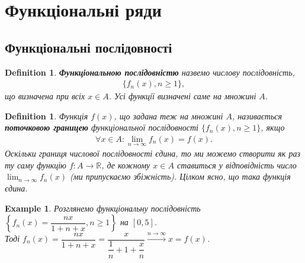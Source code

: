 \documentclass[a4paper, 10pt]{article}
\def\huge{\displaystyle}
\theoremstyle{theoremdd}
\theoremstyle{theoremdd}
\theoremstyle{theoremdd}
\newtheorem{definition}[theorem]{Definition}
\theoremstyle{theoremdd}
\theoremstyle{theoremdd}
\newtheorem{example}[theorem]{Example}
\theoremstyle{theoremdd}
\theoremstyle{theoremdd}
\theoremstyle{theoremdd}
\theoremstyle{theoremdd}
\begin{document}
\iffalse
\section{Функціональні ряди}
\subsection{Функціональні послідовності}
\begin{definition}
\textbf{Функціональною послідовністю} назвемо числову послідовність,
\begin{align*}
\{f_n(x), n \geq 1 \},
\end{align*}
що визначена при всіх $x \in A$. Усі функції визначені саме на множині $A$.
\end{definition}

\begin{definition}
Функція $f(x)$, що задана теж на множині $A$, називається \textbf{поточковою границею} функціональної послідовності $\{f_n(x), n \geq 1\}$, якщо
\begin{align*}
\forall x \in A: \lim_{n \to \infty} f_n(x) = f(x).
\end{align*}
Оскільки границя числової послідовності єдина, то ми можемо створити як раз ту саму функцію $f \colon A \to \mathbb{R}$, де кожному $x \in A$ ставиться у відповідність число $\displaystyle\lim_{n \to \infty} f_n(x)$ (ми припускаємо збіжність). Цілком ясно, що така функція єдина.
\end{definition}

\iffalse
\begin{example}
Розглянемо послідовність $\{f_n(x) = x^n, n \geq 1\}$ на множині $[0,1]$. Тоді маємо:\\
$f(x) = \huge\lim_{n \to \infty} f_n(x) = \begin{cases} 0, & x \in [0,1) \\ 1, & x = 1 \end{cases}$.\\
Зауважимо, що всі функції $f_n \in C([0,1])$, проте $f \not\in C([0,1])$. Необхідно щось таке розглянути, щоб гранична функція була також неперервною.
\end{example}
\fi

\begin{example}
Розглянемо функціональну послідовність $\left\{ f_n(x) = \dfrac{nx}{1+n+x}, n \geq 1 \right\}$ на $[0,5]$.\\
Тоді $f_n(x) = \dfrac{nx}{1+n+x} = \dfrac{x}{\dfrac{1}{n}+ 1 + \dfrac{x}{n}} \overset{n \to \infty}{\longrightarrow} x = f(x)$.
\end{example}
\end{document}
